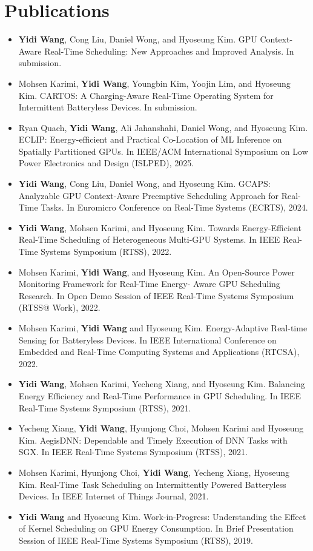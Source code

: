 \documentclass[letterpaper,10pt]{article}
\begin{document}
  \section{Publications}
  \begin{justify}
  \begin{itemize}
    \item \textbf{Yidi Wang}, Cong Liu, Daniel Wong, and Hyoseung Kim. GPU Context-Aware Real-Time Scheduling: New Approaches and Improved Analysis. In submission.
    \item Mohsen Karimi, \textbf{Yidi Wang}, Youngbin Kim, Yoojin Lim, and Hyoseung Kim. CARTOS: A Charging-Aware Real-Time Operating System for Intermittent Batteryless Devices. In submission.
   \item Ryan Quach, \textbf{Yidi Wang}, Ali Jahanshahi, Daniel Wong, and Hyoseung Kim. ECLIP: Energy-efficient and Practical Co-Location of ML Inference on Spatially Partitioned GPUs. In IEEE/ACM International Symposium on Low Power Electronics and Design (ISLPED), 2025.
    \item \textbf{Yidi Wang}, Cong Liu, Daniel Wong, and Hyoseung Kim. GCAPS: Analyzable GPU Context-Aware Preemptive Scheduling Approach for Real-Time Tasks. In Euromicro Conference on Real-Time Systems (ECRTS), 2024.
    \item \textbf{Yidi Wang}, Mohsen Karimi, and Hyoseung Kim. Towards Energy-Efficient Real-Time Scheduling of Heterogeneous Multi-GPU Systems. In IEEE Real-Time Systems Symposium (RTSS), 2022.
    \item Mohsen Karimi, \textbf{Yidi Wang}, and Hyoseung Kim. An Open-Source Power Monitoring Framework for Real-Time Energy- Aware GPU Scheduling Research. In Open Demo Session of IEEE Real-Time Systems Symposium (RTSS@ Work), 2022.
    \item Mohsen Karimi, \textbf{Yidi Wang} and Hyoseung Kim. Energy-Adaptive Real-time Sensing for Batteryless Devices. In IEEE International Conference on Embedded and Real-Time Computing Systems and Applications (RTCSA), 2022.
    \item \textbf{Yidi Wang}, Mohsen Karimi, Yecheng Xiang, and Hyoseung Kim. Balancing Energy Efficiency and Real-Time Performance in GPU Scheduling. In IEEE Real-Time Systems Symposium (RTSS), 2021.
    \item Yecheng Xiang, \textbf{Yidi Wang}, Hyunjong Choi, Mohsen Karimi and Hyoseung Kim. AegisDNN: Dependable and Timely Execution of DNN Tasks with SGX. In IEEE Real-Time Systems Symposium (RTSS), 2021.
    \item Mohsen Karimi, Hyunjong Choi, \textbf{Yidi Wang}, Yecheng Xiang, Hyoseung Kim. Real-Time Task Scheduling on Intermittently Powered Batteryless Devices. In IEEE Internet of Things Journal, 2021.
    \item \textbf{Yidi Wang} and Hyoseung Kim. Work-in-Progress: Understanding the Effect of Kernel Scheduling on GPU Energy Consumption. In Brief Presentation Session of IEEE Real-Time Systems Symposium (RTSS), 2019.
  \end{itemize}
  \end{justify}
\end{document}
